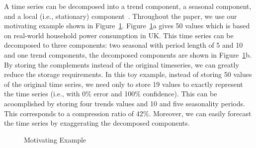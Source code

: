 A time series  can be decomposed into a trend component, a seasonal component, and a local (i.e., stationary) component~\cite{Decompose}. 
Throughout the paper, we use our motivating example shown in Figure~\ref{fig:example}. 
Figure~\ref{fig:example}a gives 50 values which is based on real-world household power consumption in UK.  This time series can be decomposed to three components: two seasonal with period length of 5 and 10  and one trend components, the decomposed components are  shown in Figure~\ref{fig:example}b. 
By storing the complements instead of the original timeseries,  we can greatly reduce the storage requirements. In this toy example, instead of storing  50 values of the original time series, we need only to store 19 values to exactly represent the time series (i.e., with 0\% error and 100\% confidence). This can be acoomplished by storing  four trends values and  10 and five seasonality periods. This corresponds to a compression ratio of 42\%. Moreover, we can easily forecast the time series by exaggerating the decomposed components.
\begin{figure}[th]
\center
{}
\caption{Motivating Example}
\label{fig:example}
\end{figure} 

